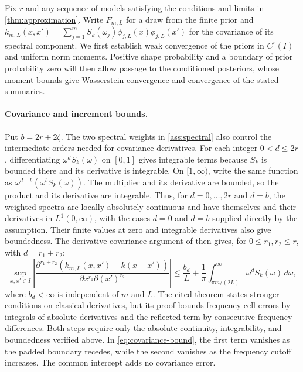 \begin{proofEnd}
Fix $r$ and any sequence of models satisfying the conditions and limits
in \cref{thm:approximation}.
Write $F_{m,L}$ for a draw from the finite prior and
$k_{m,L}(x,x')=\sum_{j=1}^mS_k(\omega_j)\phi_{j,L}(x)\phi_{j,L}(x')$
for the covariance of its spectral component.
We first establish weak convergence of the priors in $C^r(I)$ and
uniform norm moments. Positive shape probability and a boundary of
prior probability zero will then allow passage to the conditioned
posteriors, whose moment bounds give Wasserstein convergence and
convergence of the stated summaries.

\paragraph{Covariance and increment bounds.}
Put $b=2r+2\zeta$. The two spectral weights in
\cref{ass:spectral} also control the intermediate orders needed for
covariance derivatives. For each integer $0<d\leq2r$, differentiating
$\omega^dS_k(\omega)$ on $[0,1]$ gives integrable terms because $S_k$
is bounded there and its derivative is integrable. On $[1,\infty)$,
write the same function as $\omega^{d-b}(\omega^bS_k(\omega))$.
The multiplier and its derivative are bounded, so the product and its
derivative are integrable. Thus, for $d=0,\ldots,2r$ and $d=b$,
the weighted spectra are locally absolutely continuous and have
themselves and their derivatives in $L^1(0,\infty)$, with the cases
$d=0$ and $d=b$ supplied directly by the assumption. Their finite
values at zero and integrable derivatives also give boundedness.
The derivative-covariance argument of
\citet[Theorem 2 and its proof]{differentialensembles2026} then gives, for
$0\leq r_1,r_2\leq r$, with $d=r_1+r_2$:
\begin{equation}\label{eq:covariance-bound}
 \sup_{x,x'\in I}\left|
 \frac{\partial^{r_1+r_2}(k_{m,L}(x,x')-k(x-x'))}
      {\partial x^{r_1}\partial(x')^{r_2}}\right|
 \leq\frac{b_d}{L}+\frac1\pi\int_{\pi m/(2L)}^\infty
                       \omega^dS_k(\omega)\,d\omega,
\end{equation}
where $b_d<\infty$ is independent of $m$ and $L$.
The cited theorem states stronger conditions on classical derivatives,
but its proof bounds frequency-cell errors by integrals of absolute
derivatives and the reflected term by consecutive frequency differences.
Both steps require only the absolute continuity, integrability, and
boundedness verified above. In \cref{eq:covariance-bound}, the first
term vanishes as the padded boundary recedes, while the second vanishes
as the frequency cutoff increases. The common intercept adds no
covariance error.


\end{proofEnd}

